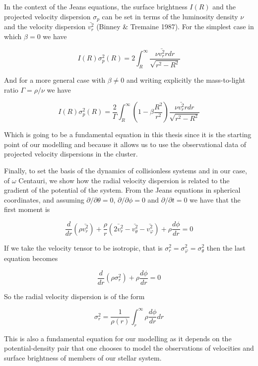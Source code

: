 In the context of the Jeans equations, the surface brightness $I(R)$ and the projected velocity dispersion $\sigma_{p}$ can be set in terms of the luminosity density $\nu$ and the velocity dispersion $\bar{v_{r}^{2}}$ (Binney \& Tremaine 1987). For the simplest case in which $\beta=0$ we have

\begin{equation}
I(R)\sigma_{p}^{2}(R)=2\int_{R}^{\infty}\frac{\nu\bar{v_{r}^{2}}rdr}{\sqrt{r^{2}-R^{2}}}
\end{equation}     

And for a more general case with $\beta \neq 0$ and writing explicitly the mass-to-light ratio $\Gamma=\rho / \nu$ we have

\begin{equation}
I(R)\sigma_{p}^{2}(R)=\frac{2}{\Gamma}\int_{R}^{\infty}\left(1-\beta\frac{R^{2}}{r^{2}}\right)\frac{\nu\bar{v_{r}^{2}}rdr}{\sqrt{r^{2}-R^{2}}}
\end{equation}

Which is going to be a fundamental equation in this thesis since it is the starting point of our modelling and because it allows us to use the observational data of projected velocity dispersions in the cluster.  

Finally, to set the basis of the dynamics of collisionless systems and in our case, of $\omega$ Centauri, we show how the radial velocity dispersion is related to the gradient of the potential of the system. From the Jeans equations in spherical coordinates, and assuming $ \partial / \partial \theta=0 $, $ \partial / \partial \phi=0 $ and $ \partial / \partial t=0 $ we have that the first moment is

\begin{equation}
\frac{d}{dr}\left(\rho\bar{v_{r}^{2}}\right)+\frac{\rho}{r}\left(\bar{2v_{r}^{2}}-\bar{v_{\theta}^{2}}-\bar{v_{\varphi}^{2}}\right)+\rho\frac{d\phi}{dr}=0
\end{equation}

If we take the velocity tensor to be isotropic, that is $\sigma_{r}^{2}=\sigma_{\varphi}^{2}=\sigma_{\theta}^{2}$ then the last equation becomes

\begin{equation}
\frac{d}{dr}\left(\rho\sigma_{r}^{2}\right)+\rho\frac{d\phi}{dr}=0
\end{equation}

So the radial velocity dispersion is of the form

\begin{equation}
\sigma_{r}^{2}=\frac{1}{\rho(r)}\int_{r}^{\infty}\rho\frac{d\phi}{dr}dr
\end{equation}

This is also a fundamental equation for our modelling as it depends on the potential-density pair that one chooses to model the observations of velocities and surface brightness of members of our stellar system.
